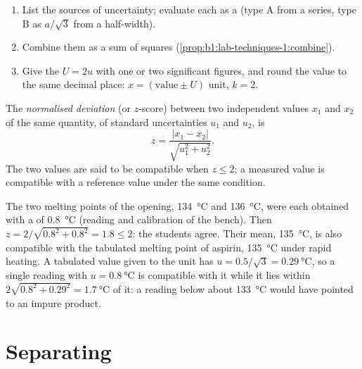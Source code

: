 \begin{method}\label{met:b1:lab-techniques-1:report-result}
\begin{enumerate}
  \item List the sources of uncertainty; evaluate each as a  (type A from a series, type B as $a/\sqrt3$ from a
        half-width).
  \item Combine them as a sum of squares (\cref{prop:b1:lab-techniques-1:combine}).
  \item Give the  $U = 2u$ with one or two
        significant figures, and round the value to the same decimal
        place: $x = (\text{value} \pm U)$ unit, $k = 2$.
\end{enumerate}
\end{method}

\begin{definition}\label{def:b1:lab-techniques-1:z-score}
The \emph{normalised deviation} (or $z$-score)
between two independent values $x_1$ and $x_2$ of the same quantity, of
standard uncertainties $u_1$ and $u_2$, is
\[
  z = \frac{|x_1 - x_2|}{\sqrt{u_1^2 + u_2^2}} .
\]
The two values are said to be compatible when $z \le 2$; a measured value
is compatible with a reference value under the same condition.
\end{definition}

\begin{example}
The two melting points of the opening, \qty{134}{\celsius} and
\qty{136}{\celsius}, were each obtained with a  of
\qty{0.8}{\celsius} (reading and calibration of the bench). Then
$z = 2/\sqrt{0.8^2 + 0.8^2} = 1.8 \le 2$: the students agree. Their mean,
\qty{135}{\celsius}, is also compatible with the tabulated melting point
of aspirin, \qty{135}{\celsius} under rapid heating. A tabulated value
given to the unit has $u = 0.5/\sqrt3 = \qty{0.29}{\celsius}$, so a single
reading with $u = \qty{0.8}{\celsius}$ is compatible with it while it lies
within $2\sqrt{0.8^2 + 0.29^2} = \qty{1.7}{\celsius}$ of it: a reading
below about \qty{133}{\celsius} would have pointed to an impure product.
\end{example}

\section{Separating}

